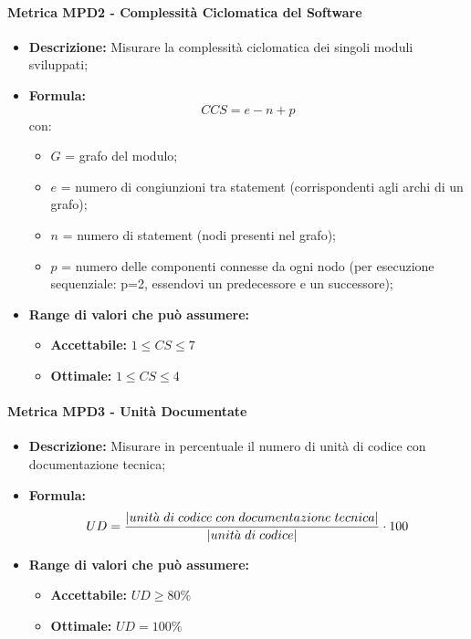 \paragraph{Metrica MPD2 - Complessità Ciclomatica del Software} 
    \begin{itemize}
    \item \textbf{Descrizione:} Misurare la complessità ciclomatica dei singoli moduli sviluppati;
 \item \textbf{Formula:} $$CCS = e - n + p$$
    con:
    \begin{itemize}
        \item $G$ = grafo del modulo;
        \item $e$ = numero di congiunzioni tra statement (corrispondenti agli archi di un grafo);
        \item $n$ = numero di statement (nodi presenti nel grafo);
        \item $p$ = numero delle componenti connesse da ogni nodo (per esecuzione sequenziale: p=2, essendovi un predecessore e un successore);
    \end{itemize}
    \item \textbf{Range di valori che può assumere:}
    \begin{itemize}
        \item \textbf{Accettabile:} $1 \leq CS \leq 7 $
        \item \textbf{Ottimale:} $ 1 \leq CS \leq 4 $
    \end{itemize}
\end{itemize}

\paragraph{Metrica MPD3 - Unità Documentate} 
\begin{itemize}
    \item \textbf{Descrizione:} Misurare in percentuale il numero di unità di codice con documentazione tecnica;
  \item \textbf{Formula:} $$UD = {|unit\grave{a} \; di \; codice \; con \; documentazione \; tecnica| \over |unit\grave{a} \; di \; codice|} \cdot 100$$
    \item \textbf{Range di valori che può assumere:}
    \begin{itemize}
        \item \textbf{Accettabile:} $UD \geq 80\%  $
        \item \textbf{Ottimale:} $UD = 100\%$
    \end{itemize}
\end{itemize}
              
